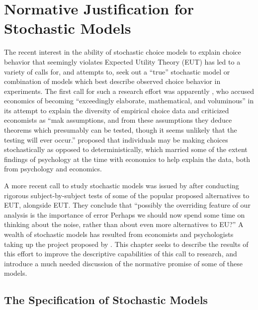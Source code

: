 \documentclass[../main.tex]{subfiles}
\begin{document}
\onehalfspacing
\setcounter{chapter}{1}
\chapter{Normative Justification for Stochastic Models}

\lltoc

The recent interest in the ability of stochastic choice models to explain choice behavior that seemingly violates Expected Utility Theory (EUT) has led to a variety of calls for, and attempts to, seek out a \enquote{true} stochastic model or combination of  models which best describe observed choice behavior in experiments.
The first call for such a research effort was apparently \textcite{Edwards1954}, who accused economics of becoming \enquote{exceedingly elaborate, mathematical, and voluminous} \textcite[380]{Edwards1954} in its attempt to explain the diversity of empirical choice data and criticized economists as \enquote{mak assumptions, and from these assumptions they deduce theorems which presumably can be tested, though it seems unlikely that the testing will ever occur.}
\textcite{Edwards1954} proposed that individuals may be making choices stochastically as opposed to deterministically, which married some of the extent findings of psychology at the time with economics to help explain the data, both from psychology and economics.

A more recent call to study stochastic models was issued by \textcite[1321]{Hey1994} after conducting rigorous subject-by-subject tests of some of the popular proposed alternatives to EUT, alongside EUT.
They conclude that \enquote{possibly the overriding feature of our analysis is the importance of error \textelp{} Perhaps we should now spend some time on thinking about the noise, rather than about even more alternatives to EU?}
A wealth of stochastic models has resulted from economists and psychologists taking up the project proposed by \textcite{Hey1994}.
This chapter seeks to describe the results of this effort to improve the descriptive capabilities of this call to research, and introduce a much needed discussion of the normative promise of some of these models.


\section{The Specification of Stochastic Models}
\end{document}
